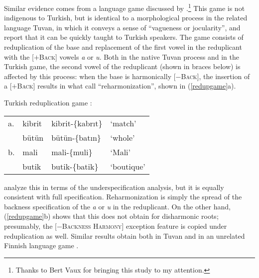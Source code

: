 Similar evidence comes from a language game discussed by \citet{Harrison2001}.\footnote{Thanks to Bert Vaux for bringing this study to my attention.} This game is not indigenous to Turkish, but is identical to a morphological process in the related language Tuvan, in which it conveys a sense of ``vagueness or jocularity'', and \citeauthor{Harrison2001} report that it can be quickly taught to Turkish speakers. The game consists of reduplication of the base and replacement of the first vowel in the reduplicant with the [$+$\textsc{Back}] vowels \emph{a} or \emph{u}. Both in the native Tuvan process and in the Turkish game, the second vowel of the reduplicant (shown in braces below) is affected by this process: when the base is harmonically [$-$\textsc{Back}], the insertion of a [$+$\textsc{Back}] results in what \citeauthor{Harrison2001} call ``reharmonization'', shown in  (\ref{redupgame}a).

\begin{example}
\label{redupgame}
Turkish reduplication game \citep[][231]{Harrison2001}:

\vspace{0.5\baselineskip}
\begin{tabular}{l l l l}
a. & kibrit & kibrit-\{kabrıt\} & `match'    \\
   & bütün  & bütün-\{batın\}   & `whole'    \\
b. & mali   & mali-\{muli\}     & `Mali'     \\
   & butik  & butik-\{batik\}   & `boutique' \\
\end{tabular}
\end{example}

\noindent \citeauthor{Harrison2001} analyze this in terms of the \citeauthor{Clements1982} underspecification analysis, but it is equally consistent with full specification. Reharmonization is simply the spread of the backness specification of the \emph{a} or \emph{u} in the reduplicant. On the other hand, (\ref{redupgame}b) shows that this does not obtain for disharmonic roots; presumably, the [$-$\textsc{Backness Harmony}] exception feature is copied under reduplication as well. Similar results obtain both in Tuvan and in an unrelated Finnish language game \citep{Campbell1986}.

